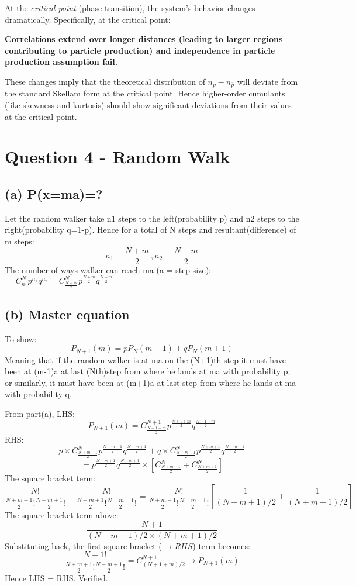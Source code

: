 \documentclass[11pt]{article}
\begin{document}
		At the \emph{critical point} (phase transition), the system's behavior changes dramatically. Specifically, at the critical point:
		
		\textbf{Correlations extend over longer distances (leading to larger regions contributing to particle production) and independence in particle production assumption fail.}
		
		These changes imply that the theoretical distribution of \( n_p - n_{\bar{p}} \) will deviate from the standard Skellam form at the critical point. Hence higher-order cumulants (like skewness and kurtosis) should show significant deviations from their values at  the critical point.
	
\section*{\color{teal} Question 4 - Random Walk}

	\subsection*{(a) P(x=ma)=?}
	
	Let the random walker take n1 steps to the left(probability p) and n2 steps to the right(probability q=1-p). 
	Hence for a total of N steps and resultant(difference) of m steps:
	\[
		n_1 = \frac{N+m}{2} \, , n_2 = \frac{N-m}{2}
	\]
	The number of ways walker can reach ma (a = step size):\\
	\( = C^N_{n_1} p^{n_1} q^{n_2}  = C^N_{\frac{N+m}{2}} p^{\frac{N+m}{2}}q^{\frac{N-m}{2}}\)
	
	\subsection*{(b) Master equation}
	To show:
	\[
		P_{N+1}(m) = p P_N(m-1) + q P_N(m+1)
	\]
	Meaning that if the random walker is at ma on the (N+1)th step it must have been at (m-1)a at last (Nth)step from where he lands at ma with probability p; or similarly, it must have been at (m+1)a at last step from where he lands at ma with probability q.
	
	From part(a), LHS:
	\[
		P_{N+1}(m) = C^{N+1}_{\frac{N+1+m}{2}} p^{\frac{N+1+m}{2}} q^{\frac{N+1-m}{2}}
	\]
	RHS:
	\[
		p \times C^{N}_{\frac{N+m-1}{2}} p^{\frac{N+m-1}{2}} q^{\frac{N-m+1}{2}}  + q \times  C^{N}_{\frac{N+m+1}{2}} p^{\frac{N+m+1}{2}} q^{\frac{N-m-1}{2}} 
	\]
	\[
		= p^{\frac{N+m+1}{2}} q^{\frac{N-m+1}{2}} \times[C^{N}_{\frac{N+m-1}{2}} + C^{N}_{\frac{N+m+1}{2}}]
	\]
	The square bracket term:
	\[
		\frac{N!}{\frac{N+m-1}{2}! \frac{N-m+1}{2}!} + \frac{N!}{\frac{N+m+1}{2}! \frac{N-m-1}{2}!} 
		= 
		\frac{N!}{\frac{N+m-1}{2}! \frac{N-m-1}{2}!}
		[\frac{1}{(N-m+1)/2} + \frac{1}{(N+m+1)/2}]
	\]
	The square bracket term above:
	\[
		\frac{N+1}{(N-m+1)/2 \times (N+m+1)/2}
	\]
	Substituting back, the first square bracket (\(\rightarrow RHS\)) term becomes:
	\[
		\frac{N+1!}{\frac{N+m+1}{2}!\frac{N-m+1}{2}!} = C^{N+1}_{(N+1+m)/2} \rightarrow P_{N+1}(m)
	\]
	Hence LHS = RHS. Verified.
	
\end{document}
